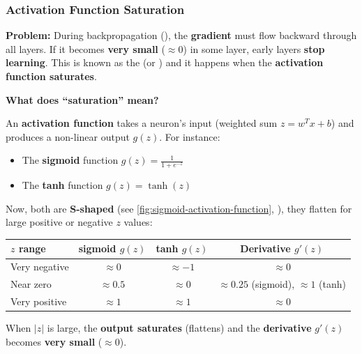 \subsubsection{Activation Function Saturation}\label{sec:activation-function-saturation}\label{def:vanishing-gradient-problem}

\textcolor{Red2}{ \textbf{Problem:}} During backpropagation (), the \textbf{gradient} must flow backward through all layers. If it becomes \textbf{very small} ($\approx 0$) in some layer, early layers \textbf{stop learning}. This is known as the  (or ) and it happens when the \textbf{activation function saturates}.

\highspace
\begin{flushleft}
    \textcolor{Green3}{ \textbf{What does ``saturation'' mean?}}
\end{flushleft}
An \textbf{activation function} takes a neuron's input (weighted sum $z = w^{T} x + b$) and produces a non-linear output $g(z)$. For instance:
\begin{itemize}
    \item The \textbf{sigmoid} function $g(z) = \frac{1}{1 + e^{-z}}$
    \item The \textbf{tanh} function $g(z) = \tanh(z)$
\end{itemize}
Now, both are \textbf{S-shaped} (see \autoref{fig:sigmoid-activation-function}, ), they flatten for large positive or negative $z$ values:

\begin{table}[!htp]
    \centering
    \begin{tabular}{@{} l | c c c @{}}
        \toprule
        $z$ range & sigmoid $g(z)$ & tanh $g(z)$ & Derivative $g'(z)$ \\
        \midrule
        Very negative & $\approx 0$ & $\approx -1$ & $\approx 0$ \\
        Near zero & $\approx 0.5$ & $\approx 0$ & $\approx 0.25$ (sigmoid), $\approx 1$ (tanh) \\
        Very positive & $\approx 1$ & $\approx 1$ & $\approx 0$ \\
        \bottomrule
    \end{tabular}
\end{table}

\noindent
When $\left|z\right|$ is large, the \textbf{output saturates} (flattens) and the \textbf{derivative} $g'(z)$ becomes \textbf{very small} ($\approx 0$).

